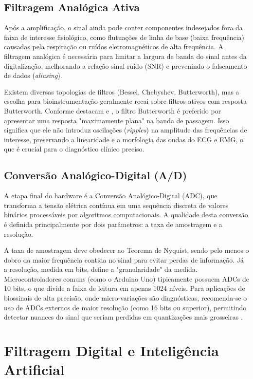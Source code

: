 \documentclass[tcc,capa]{texufpel}
\begin{document}
\subsection{Filtragem Analógica Ativa}
Após a amplificação, o sinal ainda pode conter componentes indesejados fora da faixa de interesse fisiológico, como flutuações de linha de base (baixa frequência) causadas pela respiração ou ruídos eletromagnéticos de alta frequência. A filtragem analógica é necessária para limitar a largura de banda do sinal antes da digitalização, melhorando a relação sinal-ruído (SNR) e prevenindo o falseamento de dados (\textit{aliasing}).

Existem diversas topologias de filtros (Bessel, Chebyshev, Butterworth), mas a escolha para bioinstrumentação geralmente recai sobre filtros ativos com resposta Butterworth. Conforme destacam \cite{balbinot2019v1} e \cite{marchetti2006}, o filtro Butterworth é preferido por apresentar uma resposta "maximamente plana" na banda de passagem. Isso significa que ele não introduz oscilações (\textit{ripples}) na amplitude das frequências de interesse, preservando a linearidade e a morfologia das ondas do ECG e EMG, o que é crucial para o diagnóstico clínico preciso.

\subsection{Conversão Analógico-Digital (A/D)}
A etapa final do hardware é a Conversão Analógico-Digital (ADC), que transforma a tensão elétrica contínua em uma sequência discreta de valores binários processáveis por algoritmos computacionais. A qualidade desta conversão é definida principalmente por dois parâmetros: a taxa de amostragem e a resolução.

A taxa de amostragem deve obedecer ao Teorema de Nyquist, sendo pelo menos o dobro da maior frequência contida no sinal para evitar perdas de informação. Já a resolução, medida em bits, define a "granularidade" da medida. Microcontroladores comuns (como o Arduino Uno) tipicamente possuem ADCs de 10 bits, o que divide a faixa de leitura em apenas 1024 níveis. Para aplicações de biossinais de alta precisão, onde micro-variações são diagnósticas, recomenda-se o uso de ADCs externos de maior resolução (como 16 bits ou superior), permitindo detectar nuances do sinal que seriam perdidas em quantizações mais grosseiras \cite{balbinot2019v1}.

\section{Filtragem Digital e Inteligência Artificial}
\label{sec:filtragem_ia}
\end{document}
